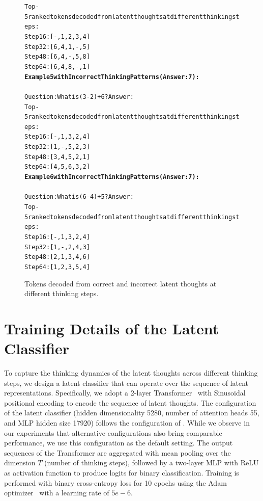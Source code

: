 \documentclass{article} %
\begin{document}
\begin{figure}
\begin{AIBox}{}
{\begin{alltt}
Top-5 ranked tokens decoded from latent thoughts at different thinking steps:\\
Step 16: [-, 1, 2, 3, 4]\\
Step 32: [6, 4, 1, -, 5]\\
Step 48: [6, 4, -, 5, 8]\\
Step 64: [6, 4, 8, -, 1]
\tcbline
\textbf{Example 5 with Incorrect Thinking Patterns (Answer: 7):}\\
\\
Question: What is (3 - 2) + 6? Answer:\\
Top-5 ranked tokens decoded from latent thoughts at different thinking steps:\\
Step 16: [-, 1, 3, 2, 4]\\
Step 32: [1, -, 5, 2, 3]\\
Step 48: [3, 4, 5, 2, 1]\\
Step 64: [4, 5, 6, 3, 2]
\tcbline
\textbf{Example 6 with Incorrect Thinking Patterns (Answer: 7):}\\
\\
Question: What is (6 - 4) + 5? Answer:\\
Top-5 ranked tokens decoded from latent thoughts at different thinking steps:\\
Step 16: [-, 1, 3, 2, 4]\\
Step 32: [1, -, 2, 4, 3]\\
Step 48: [2, 1, 3, 4, 6]\\
Step 64: [1, 2, 3, 5, 4]
\end{alltt}}

\end{AIBox}
\caption{Tokens decoded from correct and incorrect latent thoughts at different thinking steps.}
\label{fig:interpretability_analysis}
\end{figure}
\section{Training Details of the Latent Classifier}\label{appendix:training_details_latent_classifier}
To capture the thinking dynamics of the latent thoughts across different thinking steps, we design a latent classifier that can operate over the sequence of latent representations.
%
Specifically, we adopt a 2-layer Transformer~\citep{vaswani2017attention} with Sinusoidal positional encoding to encode the sequence of latent thoughts. The configuration of the latent classifier (hidden dimensionality 5280, number of attention heads 55, and MLP hidden size 17920) follows the configuration of \LRLM. 
%
While we observe in our experiments that alternative configurations also bring comparable performance, we use this configuration as the default setting. 
%
The output sequences of the Transformer are aggregated with mean pooling over the dimension $T$ (number of thinking steps), followed by a two-layer MLP with ReLU as activation function to produce logits for binary classification. Training is performed with binary cross-entropy loss for 10 epochs using the Adam optimizer~\citep{Diederik2015adam} with a learning rate of $5e-6$.
\end{document}
